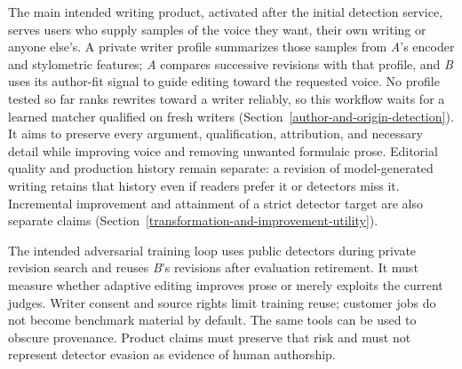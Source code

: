 The main intended writing product, activated after the initial detection service,
serves users who supply samples of the voice they want, their own writing or
anyone else's. A private writer profile summarizes those samples from
\textit{A}'s encoder and stylometric features; \textit{A} compares successive
revisions with that profile, and \textit{B} uses its author-fit signal to guide
editing toward the requested voice. No profile
tested so far ranks rewrites toward a writer reliably, so this workflow waits
for a learned matcher qualified on fresh writers
(Section~\ref{author-and-origin-detection}). It aims to
preserve every argument, qualification, attribution, and necessary detail while
improving voice and removing unwanted formulaic prose. Editorial quality and
production history remain separate: a revision of model-generated writing
retains that history even if readers prefer it or detectors miss it. Incremental
improvement and attainment of a strict detector target are also separate claims
(Section~\ref{transformation-and-improvement-utility}).

The intended adversarial training loop uses public detectors during
private revision search and reuses \textit{B}'s revisions after evaluation
retirement. It must measure whether adaptive editing improves prose or merely
exploits the current judges. Writer consent and source rights limit training
reuse; customer jobs do not become benchmark material by default. The same
tools can be used to obscure provenance. Product claims must preserve that risk
and must not represent detector evasion as evidence of human authorship.
